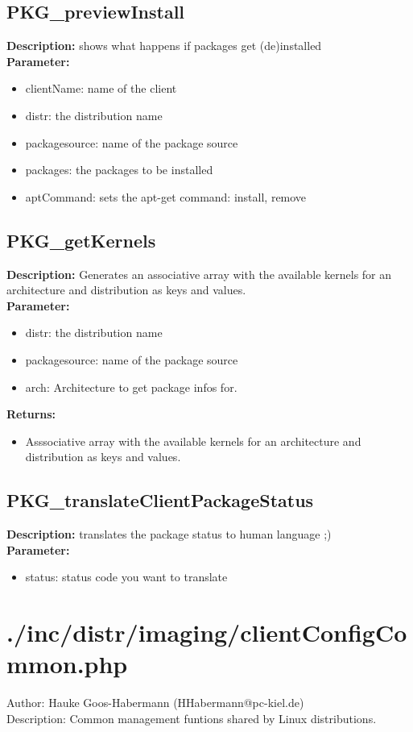\subsection{PKG\_previewInstall}
\textbf{Description:} shows what happens if packages get (de)installed\\
\textbf{Parameter:}
\begin{itemize}
\item clientName: name of the client
\item distr: the distribution name
\item packagesource: name of the package source
\item packages: the packages to be installed
\item aptCommand: sets the apt-get command: install, remove
\end{itemize}

\subsection{PKG\_getKernels}
\textbf{Description:} Generates an associative array with the available kernels for an architecture and distribution as keys and values.\\
\textbf{Parameter:}
\begin{itemize}
\item distr: the distribution name
\item packagesource: name of the package source
\item arch: Architecture to get package infos for.
\end{itemize}
\textbf{Returns:}
\begin{itemize}
\item Asssociative array with the available kernels for an architecture and distribution as keys and values.
\end{itemize}

\subsection{PKG\_translateClientPackageStatus}
\textbf{Description:} translates the package status to human language ;)\\
\textbf{Parameter:}
\begin{itemize}
\item status: status code you want to translate
\end{itemize}

\newpage\section{./inc/distr/imaging/clientConfigCommon.php}
 Author: Hauke Goos-Habermann (HHabermann@pc-kiel.de)\\
 Description: Common management funtions shared by Linux distributions.\\

